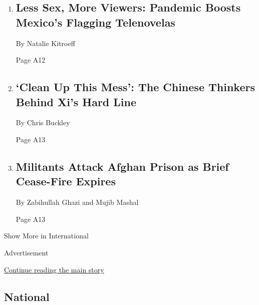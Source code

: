 \begin{enumerate}
\def\labelenumi{\arabic{enumi}.}
\item
  \href{/2020/08/02/world/americas/mexico-tv-virus-telenovela.html}{}

  \hypertarget{less-sex-more-viewers-pandemic-boosts-mexicos-flagging-telenovelas-1}{%
  \subsection{Less Sex, More Viewers: Pandemic Boosts Mexico's Flagging
  Telenovelas}\label{less-sex-more-viewers-pandemic-boosts-mexicos-flagging-telenovelas-1}}

  By Natalie Kitroeff

  Page A12
\item
  \href{/2020/08/02/world/asia/china-hong-kong-national-security-law.html}{}

  \hypertarget{clean-up-this-mess-the-chinese-thinkers-behind-xis-hard-line}{%
  \subsection{`Clean Up This Mess': The Chinese Thinkers Behind Xi's
  Hard
  Line}\label{clean-up-this-mess-the-chinese-thinkers-behind-xis-hard-line}}

  By Chris Buckley

  Page A13
\item
  \href{/2020/08/02/world/asia/afghan-prison-attack-prisoners.html}{}

  \hypertarget{militants-attack-afghan-prison-as-brief-cease-fire-expires}{%
  \subsection{Militants Attack Afghan Prison as Brief Cease-Fire
  Expires}\label{militants-attack-afghan-prison-as-brief-cease-fire-expires}}

  By Zabihullah Ghazi and Mujib Mashal

  Page A13
\end{enumerate}

Show More in International

Advertisement

\protect\hyperlink{after-mid2}{Continue reading the main story}

\hypertarget{national}{%
\subsection{National}\label{national}}

